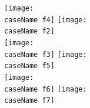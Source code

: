 \documentclass[12pt]{article}
\begin{document}
\begin{center}
\newcommand{\caseName}{AGC}
\texttt{[image: \\caseName f4]} %
\texttt{[image: \\caseName f2]} \\%
\texttt{[image: \\caseName f3]} %
\texttt{[image: \\caseName f5]} \\%
\texttt{[image: \\caseName f6]} %
\texttt{[image: \\caseName f7]} \\%
\end{center}

\end{document}

